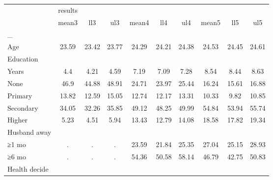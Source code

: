 \begin{tabular}{l*{9}{c}}
\toprule
                    &     results&            &            &            &            &            &            &            &            \\
                    &       mean3&         ll3&         ul3&       mean4&         ll4&         ul4&       mean5&         ll5&         ul5\\
\midrule
\_                   &            &            &            &            &            &            &            &            &            \\
Age                 &       23.59&       23.42&       23.77&       24.29&       24.21&       24.38&       24.53&       24.45&       24.61\\
\midrule
Education           &            &            &            &            &            &            &            &            &            \\
Years               &         4.4&        4.21&        4.59&        7.19&        7.09&        7.28&        8.54&        8.44&        8.63\\
None                &        46.9&       44.88&       48.91&       24.71&       23.97&       25.44&       16.24&       15.61&       16.88\\
Primary             &       13.82&       12.59&       15.05&       12.74&       12.17&       13.31&       10.33&        9.82&       10.85\\
Secondary           &       34.05&       32.26&       35.85&       49.12&       48.25&       49.99&       54.84&       53.94&       55.74\\
Higher              &        5.23&        4.51&        5.94&       13.43&       12.79&       14.08&       18.58&       17.82&       19.34\\
\midrule
Husband away        &            &            &            &            &            &            &            &            &            \\
≥1 mo               &           .&           .&           .&       23.59&       21.84&       25.35&       27.04&       25.15&       28.93\\
≥6 mo               &           .&           .&           .&       54.36&       50.58&       58.14&       46.79&       42.75&       50.83\\
\midrule
Health decide       &            &            &            &            &            &            &            &            &            \\

\end{tabular}
